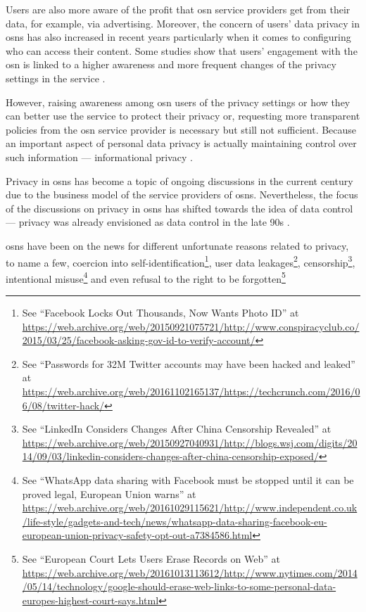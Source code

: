 Users are also more aware of the profit that \ac{osn} service providers get from 
their data, for example, via advertising. Moreover, the concern of users' data privacy 
in \acp{osn} has also increased in recent years particularly when it comes to configuring 
who can access their content. Some studies show that users' engagement with the 
\ac{osn} is linked to a higher awareness and more frequent changes of the privacy 
settings in the service \cite{boydH10}.

However, raising awareness among \ac{osn} users of the privacy settings or how they 
can better use the service to protect their privacy or, requesting more transparent 
policies from the \ac{osn} service provider is necessary but still not sufficient. 
Because an important aspect of personal data privacy is actually maintaining control 
over such information --- informational privacy \cite{Cavoukian96}.

Privacy in \acp{osn} has become a topic of ongoing discussions in the current century 
due to the business model of the service providers of \acp{osn}. Nevertheless, the 
focus of the discussions on privacy in \acp{osn} has shifted towards the idea of 
data control --- privacy was already envisioned as data control in the late 90s 
\cite{Allen99}.

\acp{osn} have been on the news for different unfortunate reasons related to privacy, 
to name a few, coercion into self-identification\footnote{See ``Facebook Locks Out Thousands, Now Wants Photo ID'' at \url{https://web.archive.org/web/20150921075721/http://www.conspiracyclub.co/2015/03/25/facebook-asking-gov-id-to-verify-account/}}, 
user data leakages\footnote{See ``Passwords for 32M Twitter accounts may have been hacked and leaked'' at \url{https://web.archive.org/web/20161102165137/https://techcrunch.com/2016/06/08/twitter-hack/}}, 
censorship\footnote{See ``LinkedIn Considers Changes After China Censorship Revealed'' at \url{https://web.archive.org/web/20150927040931/http://blogs.wsj.com/digits/2014/09/03/linkedin-considers-changes-after-china-censorship-exposed/}}, 
intentional misuse\footnote{See ``WhatsApp data sharing with Facebook must be stopped until it can be proved legal, European Union warns'' at \url{https://web.archive.org/web/20161029115621/http://www.independent.co.uk/life-style/gadgets-and-tech/news/whatsapp-data-sharing-facebook-eu-european-union-privacy-safety-opt-out-a7384586.html}} 
and even refusal to the right to be forgotten\footnote{See ``European Court Lets Users Erase Records on Web'' at \url{https://web.archive.org/web/20161013113612/http://www.nytimes.com/2014/05/14/technology/google-should-erase-web-links-to-some-personal-data-europes-highest-court-says.html}}


